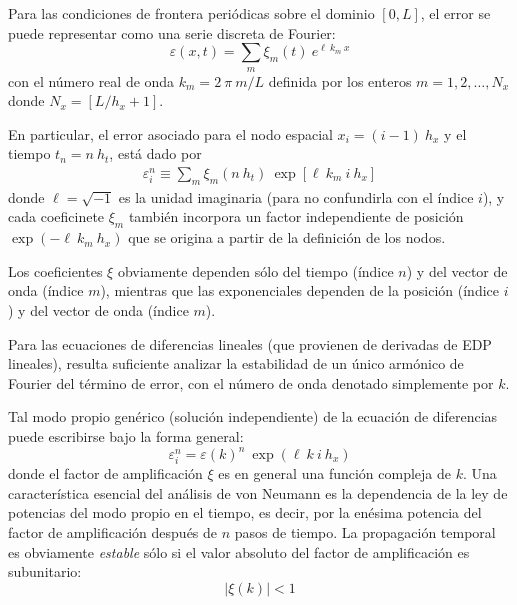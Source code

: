 \par
Para las condiciones de frontera periódicas sobre el dominio $[0, L]$, el error se puede representar como una serie discreta de Fourier:
\begin{equation}
\varepsilon (x, t) = \sum_{m} \xi_{m} (t) \: e^{\ell \: k_{m} \: x}
\label{eq:ecuacion_13_56}
\end{equation}
con el número real de onda $k_{m} = 2 \: \pi \: m / L$ definida por los enteros $m = 1, 2, \ldots, N_{x}$ donde $N_{x} = [ L / h_{x} +  1]$.
\par
En particular, el error asociado para el nodo espacial $x_{i} = (i - 1) \: h_{x}$ y el tiempo $t_{n} = n \: h_{t}$, está dado por
\begin{align*}
\varepsilon_{i}^{n} \equiv \sum_{m} \xi_{m} (n \: h_{t}) \: \exp \left[ \ell \: k_{m} \: i \: h_{x} \right]
\end{align*}
donde $\ell = \sqrt{-1}$ es la unidad imaginaria (para no confundirla con el índice $i$), y cada coeficinete $\xi_{m}$ también incorpora un factor independiente de posición $\exp(-\ell \: k_{m} \: h_{x})$ que se origina a partir de la definición de los nodos.
\par
Los coeficientes $\xi$ obviamente dependen sólo del tiempo (índice $n$) y del vector de onda (índice $m$), mientras que las exponenciales dependen de la posición (índice $i$) y del vector de onda (índice $m$).
\par
Para las ecuaciones de diferencias lineales (que provienen de derivadas de EDP lineales), resulta suficiente analizar la estabilidad de un único armónico de Fourier del término de error, con el número de onda denotado simplemente por $k$.
\par
Tal modo propio genérico (solución independiente) de la ecuación de diferencias puede escribirse bajo la forma general:
\begin{equation}
\varepsilon_{i}^{n} = \varepsilon(k)^{n} \: \exp(\ell \: k \: i \: h_{x})
\label{eq:ecuacion_13_57}
\end{equation}
donde el factor de amplificación $\xi$ es en general una función compleja de $k$. Una característica esencial del análisis de von Neumann es la dependencia de la ley de potencias del modo propio en el tiempo, es decir, por la enésima potencia del factor de amplificación después de $n$ pasos de tiempo. La propagación temporal es obviamente \emph{estable} sólo si el valor absoluto del factor de amplificación es subunitario:
\begin{equation}
\vert \xi (k) \vert < 1
\label{eq:ecuacion_13_58}
\end{equation}

